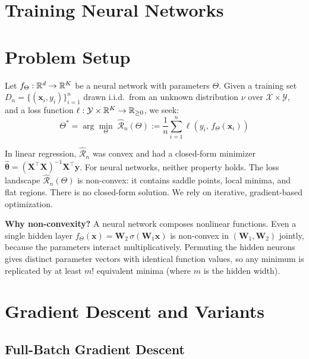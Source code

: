 \documentclass[main.tex]{subfiles}
\begin{document}
\section*{\Huge\textcolor{mantis}{Training Neural Networks}}
\vspace{0.5cm}

\needspace{0.33\textheight}
\section{Problem Setup}

Let $f_\Theta : \mathbb{R}^d \to \mathbb{R}^K$ be a neural network with parameters $\Theta$. Given a training set $D_n = \{(\mathbf{x}_i, y_i)\}_{i=1}^{n}$ drawn i.i.d.\ from an unknown distribution $\nu$ over $\mathcal{X} \times \mathcal{Y}$, and a loss function $\ell : \mathcal{Y} \times \mathbb{R}^K \to \mathbb{R}_{\geq 0}$, we seek:
$$\Theta^* = \arg\min_\Theta \; \hat{\mathcal{R}}_n(\Theta) := \frac{1}{n}\sum_{i=1}^{n}\ell\!\left(y_i,\, f_\Theta(\mathbf{x}_i)\right)$$

In linear regression, $\hat{\mathcal{R}}_n$ was convex and had a closed-form minimizer $\hat{\boldsymbol{\theta}} = (\mathbf{X}^\top\mathbf{X})^{-1}\mathbf{X}^\top\mathbf{y}$. For neural networks, neither property holds. The loss landscape $\hat{\mathcal{R}}_n(\Theta)$ is non-convex: it contains saddle points, local minima, and flat regions. There is no closed-form solution. We rely on iterative, gradient-based optimization.

\textbf{Why non-convexity?} A neural network composes nonlinear functions. Even a single hidden layer $f_\Theta(\mathbf{x}) = \mathbf{W}_2\,\sigma(\mathbf{W}_1 \mathbf{x})$ is non-convex in $(\mathbf{W}_1, \mathbf{W}_2)$ jointly, because the parameters interact multiplicatively. Permuting the hidden neurons gives distinct parameter vectors with identical function values, so any minimum is replicated by at least $m!$ equivalent minima (where $m$ is the hidden width).

\needspace{0.33\textheight}
\section{Gradient Descent and Variants}

\subsection{Full-Batch Gradient Descent}
\end{document}

